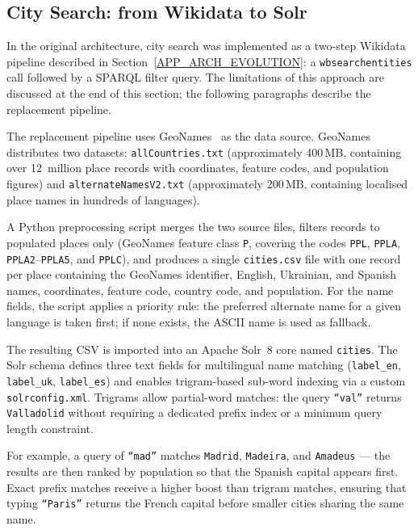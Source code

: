 \subsection{City Search: from Wikidata to Solr}\label{APP_ARCH_SOLR}

In the original architecture, city search was implemented as a two-step
Wikidata pipeline described in Section~\ref{APP_ARCH_EVOLUTION}: a
\texttt{wbsearchentities} call followed by a SPARQL filter query. The
limitations of this approach are discussed at the end of this section;
the following paragraphs describe the replacement pipeline.

The replacement pipeline uses GeoNames~\cite{geonames} as the data source.
GeoNames distributes two datasets: \texttt{allCountries.txt} (approximately
400\,MB, containing over 12~million place records with coordinates, feature
codes, and population figures) and \texttt{alternateNamesV2.txt} (approximately
200\,MB, containing localised place names in hundreds of languages).

A Python preprocessing script merges the two source files, filters records to
populated places only (GeoNames feature class \texttt{P}, covering the codes
\texttt{PPL}, \texttt{PPLA}, \texttt{PPLA2}--\texttt{PPLA5}, and \texttt{PPLC}),
and produces a single \texttt{cities.csv} file with one record per place
containing the GeoNames identifier, English, Ukrainian, and Spanish names,
coordinates, feature code, country code, and population. For the name fields,
the script applies a priority rule: the preferred alternate name for a given
language is taken first; if none exists, the ASCII name is used as fallback.

The resulting CSV is imported into an Apache Solr~8 core named
\texttt{cities}. The Solr schema defines three text fields for multilingual
name matching (\texttt{label\_en}, \texttt{label\_uk}, \texttt{label\_es})
and enables trigram-based sub-word indexing via a custom
\texttt{solrconfig.xml}. Trigrams allow partial-word matches: the query
\texttt{``val''} returns \texttt{Valladolid} without requiring a dedicated
prefix index or a minimum query length constraint.

For example, a query of \texttt{``mad''} matches \texttt{Madrid},
\texttt{Madeira}, and \texttt{Amadeus} --- the results are then ranked by
population so that the Spanish capital appears first. Exact prefix matches
receive a higher boost than trigram matches, ensuring that typing
\texttt{``Paris''} returns the French capital before smaller cities sharing
the same name.

